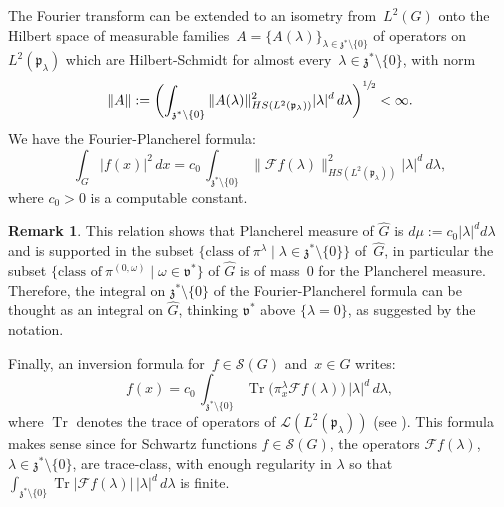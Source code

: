 \documentclass[10pt]{amsart}
\let\mathcal\mathscr
\let\sep\mid
\DeclareMathOperator{\Tr}{Tr}
\theoremstyle{plain}
\theoremstyle{definition}
\newtheorem{remark}[theorem]{Remark}
\begin{document}
The Fourier transform can be extended to an isometry from~$L^2(G)$ onto the Hilbert
space of measurable families~$ A = \{ A (\lambda) \}_{\lambda \in{\mathfrak z}^*\setminus \{0\}}$
of operators on~$L^2(\mathfrak p_\lambda)$ which are
Hilbert-Schmidt for almost every~$\lambda\in{\mathfrak z}^*\setminus \{0\}$, with norm
\[
\|A\| := \biggl(\int_{\mathfrak z^* \setminus\{0\}}
\|A (\lambda)\|_{HS (L^2(\mathfrak p_\lambda))}^2 |\lambda|^d \, d\lambda
\biggr)^{\sfrac{1}{2}}<\infty.
\]
We have the Fourier-Plancherel formula:
\[
\int_G |f(x)|^2 \, dx
= c_0 \, \int_{\mathfrak z^* \setminus\{0\}} \|{\mathcal F}f(\lambda)\|_{HS(L^2(\mathfrak p_\lambda))}^2 |\lambda|^d \, d\lambda,
\]
where $c_0>0$ is a computable constant.

\begin{remark}\label{rem:Ghat}
This relation shows that Plancherel measure of $\widehat G$ is $d\mu:= c_0|\lambda|^d d\lambda$ and is supported in the subset $\{\mbox{class of} \ \pi^\lambda \sep \lambda \in \mathfrak z^* \setminus\{0\}\}$ of~$\widehat G$, in particular the subset $\{\mbox{class of} \ \pi^{(0,\omega)} \sep \omega \in \mathfrak v^* \}$ of $\widehat G$ is of mass~$0$ for the Plancherel measure. Therefore, the integral on $\mathfrak z^*\setminus \{0\}$ of the Fourier-Plancherel formula can be thought as an integral on $\widehat G$, thinking $\mathfrak v^*$ above $\{\lambda=0\}$, as suggested by the notation.
\end{remark}

Finally, an inversion formula for~$ f \in {\mathcal S}(G)$ and~$x\in G$ writes:
\begin{equation}
\label{inversionformula} f(x)
= c_0 \, \int_{\mathfrak z^* \setminus\{0\}} \Tr \Big(\pi^{\lambda}_{x} {\mathcal F}f(\lambda) \Big)\, |\lambda|^d\,d\lambda,
\end{equation}
where $\Tr$ denotes the trace of operators of ${\mathcal L}(L^2({\mathfrak p}_\lambda))$ (see \cite[Th.\,2.7]{Tay}).
This formula makes sense since for Schwartz functions $f \in {\mathcal S}(G)$, the operators ${\mathcal F}f(\lambda)$, \hbox{$\lambda\!\in\!\mathfrak z^*\!\setminus\!\{0\}$}, are trace-class, with enough regularity in $\lambda$ so that $\int_{\mathfrak z^* \setminus\{0\}} \Tr \Big| {\mathcal F}f(\lambda) \Big|\, |\lambda|^d\,d\lambda$ is finite.
\end{document}
